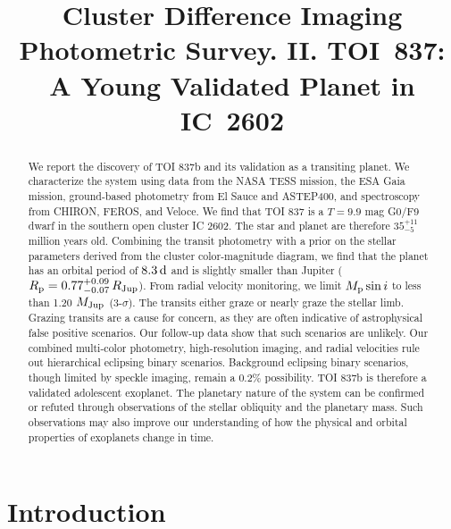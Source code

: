 \documentclass[12pt,twocolumn,tighten]{aastex63}
\begin{document}

\title{
  Cluster Difference Imaging Photometric Survey. II.
  TOI~837: A Young Validated Planet in IC~2602
}



\begin{abstract}
  We report the discovery of TOI 837b and its validation as a
  transiting planet.  We characterize the system using data from the
  NASA TESS mission, the ESA Gaia mission, ground-based photometry
  from El Sauce and ASTEP400, and spectroscopy from CHIRON, FEROS, and
  Veloce.  We find that TOI 837 is a $T=9.9$ mag G0/F9 dwarf in the
  southern open cluster IC 2602.  The star and planet are therefore
  $35^{+11}_{-5}$ million years old.  Combining the transit photometry
  with a prior on the stellar parameters derived from the cluster
  color-magnitude diagram, we find that the planet has an orbital
  period of $8.3\,{\rm d}$ and is slightly smaller than Jupiter
  ($R_{\rm p} = 0.77^{+0.09}_{-0.07} \,R_{\rm Jup}$).  From radial
  velocity monitoring, we limit $M_{\rm p}\sin i$ to less than 1.20
  $M_{\rm Jup}$ (3-$\sigma$).  The transits either graze or nearly
  graze the stellar limb.  Grazing transits are a cause for concern,
  as they are often indicative of astrophysical false positive
  scenarios.  Our follow-up data show that such scenarios are
  unlikely.  Our combined multi-color photometry, high-resolution
  imaging, and radial velocities rule out hierarchical eclipsing
  binary scenarios.  Background eclipsing binary scenarios, though
  limited by speckle imaging, remain a 0.2\% possibility.  TOI 837b is
  therefore a validated adolescent exoplanet.  The planetary nature of
  the system can be confirmed or refuted through observations of the
  stellar obliquity and the planetary mass.  Such observations may also
  improve our understanding of how the physical and orbital properties
  of exoplanets change in time.
\end{abstract}




\section{Introduction}
\end{document}
